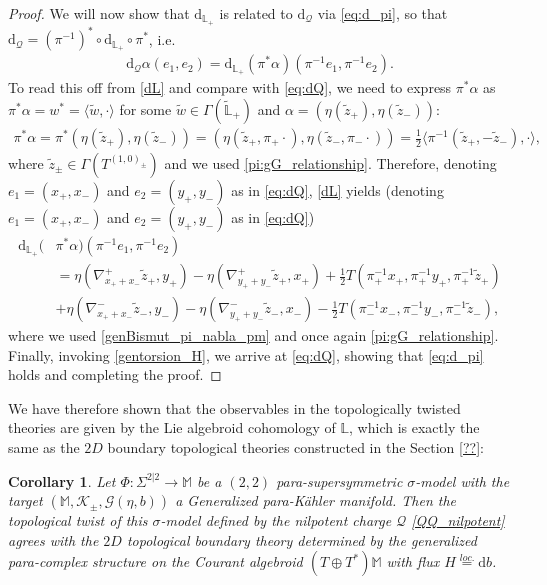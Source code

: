 \documentclass{article}
\newcommand{\TT}{{T\oplus T^*}}
\newcommand{\KK}{\mathcal{K}}
\newcommand{\GG}{\mathcal{G}}
\newcommand{\QQ}{\mathcal{Q}}
\newcommand{\ap}{\alpha}
\newcommand{\n}{\nabla}
\newcommand{\rd}{\mathrm{d}}
\newcommand{\Lb}{\mathbb{L}}
\newcommand{\se}{\Gamma}
\newcommand{\la}{\langle}
\newcommand{\ra}{\rangle}
\newcommand{\zt}{\tl{z}}
\newcommand{\Mb}{\mathbb{M}}
\def\tl{\tilde}
\newtheorem{corollary}[theorem]{Corollary}
\theoremstyle{definition}
\theoremstyle{remark}
\begin{document}
\begin{proof}
We will now show that $\rd_{\Lb_+}$ is related to $\rd_\QQ$ via \eqref{eq:d_pi}, so that $\rd_\QQ=(\pi^{-1})^*\circ \rd_{\Lb_+}\circ \pi^*$, i.e.
\begin{align*}
\rd_\QQ\ap(e_1,e_2)=\rd_{\Lb_+}(\pi^*\ap)(\pi^{-1}e_1,\pi^{-1}e_2).
\end{align*}
To read this off from \eqref{dL} and compare with \eqref{eq:dQ}, we need to express $\pi^*\ap$ as $\pi^*\ap=w^*=\la \tl{w},\cdot\ra$ for some $\tl{w}\in\se (\tl{\Lb}_+)$ and $\ap=(\eta(\zt_+),\eta(\zt_-))$:
\begin{align*}
\pi^*\ap=\pi^*(\eta(\zt_+),\eta(\zt_-))=(\eta(\zt_+,\pi_+\cdot),\eta(\zt_-,\pi_-\cdot))=\frac{1}{2}\la\pi^{-1}(\zt_+,-\zt_-),\cdot\ra,
\end{align*}
where $\zt_\pm\in \se(T^{(1,0)_\pm})$ and we used \eqref{pi:gG_relationship}. Therefore, denoting $e_1=(x_+,x_-)$ and $e_2=(y_+,y_-)$ as in \eqref{eq:dQ}, \eqref{dL} yields (denoting $e_1=(x_+,x_-)$ and $e_2=(y_+,y_-)$ as in \eqref{eq:dQ})
\begin{align*}
\rd_{\Lb_+}(&\pi^*\ap)(\pi^{-1}e_1,\pi^{-1}e_2)\\
&=\eta(\n^+_{x_++x_-}\zt_+,y_+)-\eta(\n^+_{y_++y_-}\zt_+,x_+)+\frac{1}{2}T(\pi_+^{-1}x_+,\pi_+^{-1}y_+,\pi_+^{-1}\zt_+)\\
&+\eta(\n^-_{x_++x_-}\zt_-,y_-)-\eta(\n^-_{y_++y_-}\zt_-,x_-)-\frac{1}{2}T(\pi_-^{-1}x_-,\pi_-^{-1}y_-,\pi_-^{-1}\zt_-),
\end{align*}
where we used \eqref{genBismut_pi_nabla_pm} and once again \eqref{pi:gG_relationship}. Finally, invoking \eqref{gentorsion_H}, we arrive at \eqref{eq:dQ}, showing that \eqref{eq:d_pi} holds and completing the proof.
\end{proof}

We have therefore shown that the observables in the topologically twisted theories are given by the Lie algebroid cohomology of $\Lb$, which is exactly the same as the $2D$ boundary topological theories constructed in the Section \ref{??}:

\begin{corollary}
Let $\Phi:\Sigma^{2|2}\rightarrow \Mb$ be a $(2,2)$ para-supersymmetric $\sigma$-model with the target $(\Mb,\KK_\pm,\GG(\eta,b))$ a Generalized para-K\"ahler manifold. Then the topological twist of this $\sigma$-model defined by the nilpotent charge $\QQ$ \eqref{QQ_nilpotent} agrees with the $2D$ topological boundary theory determined by the generalized para-complex structure on the Courant algebroid $(\TT)\Mb$ with flux $H\overset{loc.}{=}\rd b$.
\end{corollary}
\end{document}
